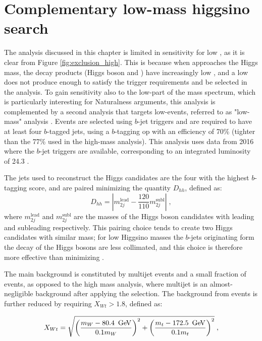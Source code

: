 \section{Complementary low-mass higgsino search}
\label{sec:ewk:LM}

The analysis discussed in this chapter is limited in sensitivity for low \mhino, as it is clear from Figure \ref{fig:exclusion_high}. 
This is because when \mhino approaches the Higgs mass, the decay products (Higgs boson and \gravino)
have increasingly low \pt, and a low \pt \gravino does not produce enough \met to satisfy the \met trigger requirements and be selected 
in the analysis. 
To gain sensitivity also to the low-\mhino part of the mass spectrum, which is particularly interesting for Naturalness arguments, 
this analysis is complemented by a second analysis that targets low-\met events, referred to as "low-mass" analysis \cite{Aaboud:2018htj}. 
Events are selected using $b$-jet triggers and are required to have at least four $b$-tagged jets, 
using a $b$-tagging \gls{op} with an efficiency of 70\%
(tighter than the 77\% used in the high-mass analysis).
This analysis uses data from 2016 where the $b$-jet triggers are available, corresponding to an integrated luminosity of 24.3 \ifb.

The jets used to reconstruct the Higgs candidates are the four with the highest $b$-tagging score, and are paired minimizing the quantity 
$D_{hh}$, defined as:
\begin{equation}
  D_{hh} = \left|m_{2j}^\textrm{lead} - \frac{120}{110}m_{2j}^\textrm{subl}\right| \; ,
\end{equation}
where $m_{2j}^\textrm{lead}$ and $m_{2j}^\textrm{subl}$ are the masses of the Higgs boson candidates with leading and subleading \pt respectively.
This pairing choice tends to create two Higgs candidates with similar mass; 
for low Higgsino masses the $b$-jets originating form the decay of the Higgs bosons are less collimated, 
and this choice is therefore more effective than minimizing \dRmax. 

The main background is constituted by multijet events and a small fraction of \ttbar events, as opposed to the
high mass analysis, where multijet is an almost-negligible background after applying the \dphimin selection. 
The background from \ttbar events is further reduced by requiring $X_{Wt}>1.8$, defined as:

\begin{equation}
 X_{Wt} = \sqrt{\left( \frac{m_W - 80.4\,\ \gev}{0.1  m_W} \right)^2 + \left( \frac{m_t - 172.5\,\ \gev}{0.1  m_t} \right)^2 } \;,
\label{eqn:xwt}
\end{equation}

